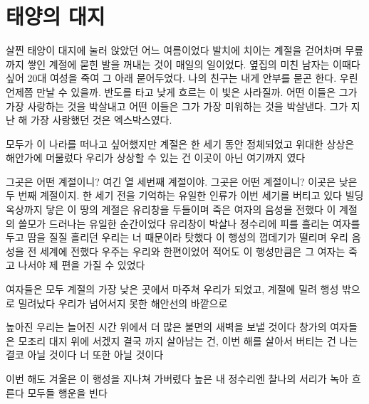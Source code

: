 \begin{article}
\hypertarget{uxd0dcuxc591uxc758-uxb300uxc9c0}{%
\chapter{태양의 대지}\label{uxd0dcuxc591uxc758-uxb300uxc9c0}}

살찐 태양이 대지에 눌러 앉았던 어느 여름이었다 발치에 치이는 계절을 걷어차며 무릎까지 쌓인 계절에 묻힌 발을 꺼내는 것이 매일의 일이었다. 옆집의 미친 남자는 이때다 싶어 20대 여성을 죽여 그 아래 묻어두었다. 나의 친구는 내게 안부를 묻곤 한다. 우린 언제쯤 만날 수 있을까. 반도를 타고 낮게 흐르는 이 빛은 사라질까. 어떤 이들은 그가 가장 사랑하는 것을 박살내고 어떤 이들은 그가 가장 미워하는 것을 박살낸다. 그가 지난 해 가장 사랑했던 것은 엑스박스였다.

모두가 이 나라를 떠나고 싶어했지만 계절은 한 세기 동안 정체되었고 위대한 상상은 해안가에 머물렀다 우리가 상상할 수 있는 건 이곳이 아닌 여기까지 였다

그곳은 어떤 계절이니? 여긴 열 세번째 계절이야. 그곳은 어떤 계절이니? 이곳은 낮은 두 번째 계절이지. 한 세기 전을 기억하는 유일한 인류가 이번 세기를 버티고 있다 빌딩 옥상까지 닿은 이 땅의 계절은 유리창을 두들이며 죽은 여자의 음성을 전했다 이 계절의 쓸모가 드러나는 유일한 순간이었다 유리창이 박살나 정수리에 피를 흘리는 여자를 두고 땀을 질질 흘리던 우리는 너 때문이라 탓했다 이 행성의 껍데기가 떨리며 우리 음성을 전 세계에 전했다 우주는 우리와 한편이었어 적어도 이 행성만큼은 그 여자는 죽고 나서야 제 편을 가질 수 있었다

여자들은 모두 계절의 가장 낮은 곳에서 마주쳐 우리가 되었고, 계절에 밀려 행성 밖으로 밀려났다 우리가 넘어서지 못한 해안선의 바깥으로

높아진 우리는 늘어진 시간 위에서 더 많은 불면의 새벽을 보낼 것이다 창가의 여자들은 모조리 대지 위에 서겠지 결국 까지 살아남는 건, 이번 해를 살아서 버티는 건 나는 결코 아닐 것이다 너 또한 아닐 것이다

이번 해도 겨울은 이 행성을 지나쳐 가버렸다 높은 내 정수리엔 찰나의 서리가 녹아 흐른다 모두들 행운을 빈다
\end{article}

